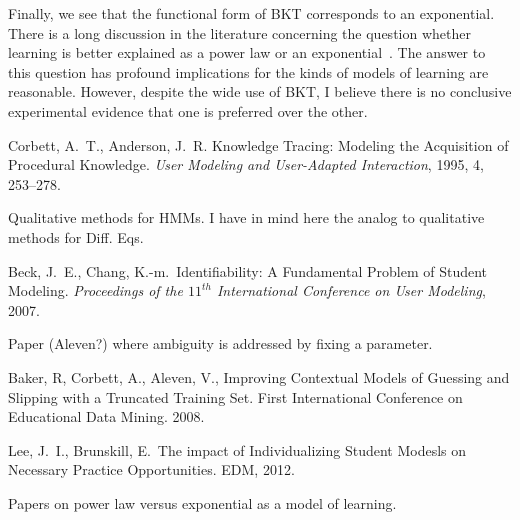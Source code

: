 \documentclass[11pt,letterpaper]{article}
\begin{document}

Finally, we see that the functional form of BKT corresponds 
to an exponential.  There is a long discussion in the literature 
concerning the question whether learning is better explained as
a power law or an exponential~\cite{powerlaw}.  The answer to this question has
profound implications for the kinds of models of learning are
reasonable.  However, despite the wide use of BKT, I believe there
is no conclusive experimental evidence that one is preferred over the 
other.


%
%



\begin{thebibliography}{9}

  Corbett, A.\ T., Anderson, J.\ R. Knowledge Tracing:  Modeling 
the Acquisition of Procedural Knowledge.  \emph{User Modeling and
 User-Adapted Interaction}, 1995, 4, 253--278.

Qualitative methods for HMMs.  I have in mind
here the analog to qualitative methods for Diff. Eqs.

  Beck, J.\ E., Chang, K.-m.\ Identifiability: A Fundamental Problem of
  Student Modeling.
  \emph{Proceedings of the $11^{th}$ International Conference on User 
    Modeling}, 2007.

Paper (Aleven?) where ambiguity is addressed by fixing 
a parameter.

 Baker, R, Corbett, A., Aleven, V.,  Improving Contextual 
    Models of Guessing and Slipping with a Truncated Training Set. 
    First International Conference on Educational Data Mining. 2008. 

   Lee, J.\ I., Brunskill, E.\ The impact of Individualizing Student 
  Modesls on Necessary Practice Opportunities.  EDM, 2012.

Papers on power law versus exponential as a model
of learning.

\end{thebibliography}
\end{document}
